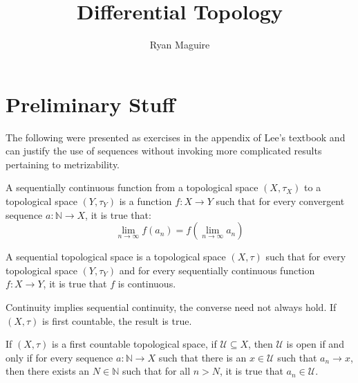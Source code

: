 \documentclass{article}                                                        %
\begin{document}
    \title{Differential Topology}
    \author{Ryan Maguire}
    \date{\vspace{-5ex}}
    \maketitle
    \section{Preliminary Stuff}
        The following were presented as exercises in the appendix of Lee's
        textbook and can justify the use of sequences without invoking more
        complicated results pertaining to metrizability.
        \begin{definition}
            A sequentially continuous function from a topological space
            $(X,\tau_{X})$ to a topological space $(Y,\tau_{Y})$ is a
            function $f:X\rightarrow{Y}$ such that for every convergent sequence
            $a:\mathbb{N}\rightarrow{X}$, it is true that:
            \begin{equation*}
                \lim_{n\rightarrow\infty}f(a_{n})
                =f(\lim_{n\rightarrow\infty}a_{n})
            \end{equation*}
        \end{definition}
        \begin{definition}
            A sequential topological space is a topological space $(X,\tau)$
            such that for every topological space $(Y,\tau_{Y})$ and for every
            sequentially continuous function $f:X\rightarrow{Y}$, it is true
            that $f$ is continuous.
        \end{definition}
        Continuity implies sequential continuity, the converse need not always
        hold. If $(X,\tau)$ is first countable, the result is true.
        \begin{theorem}
            If $(X,\tau)$ is a first countable topological space, if
            $\mathcal{U}\subseteq{X}$, then $\mathcal{U}$ is open if and only if
            for every sequence $a:\mathbb{N}\rightarrow{X}$ such that there is
            an $x\in\mathcal{U}$ such that $a_{n}\rightarrow{x}$, then there
            exists an $N\in\mathbb{N}$ such that for all $n>N$, it is true that
            $a_{n}\in\mathcal{U}$.
        \end{theorem}
\end{document}

